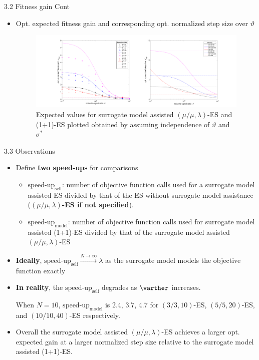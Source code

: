 \documentclass{beamer}
\begin{document}
\begin{frame}{3.2 Fitness gain Cont}
\begin{itemize}
    \item Opt. expected fitness gain and corresponding opt. normalized step size over $\vartheta$


\begin{figure}
\includegraphics[width=1.0\linewidth]{opt_stepSize_fitGain_final.pdf}
    \caption{Expected values for surrogate model assisted $(\mu/\mu,\lambda)$-ES and (1+1)-ES plotted obtained by assuming independence of $\vartheta$ and $\sigma^*$}
\end{figure}
\end{itemize} 
\end{frame}

\begin{frame}{3.3 Observations}
\begin{itemize}
    \item Define \textbf{two speed-ups} for comparisons 
    \begin{itemize}
        \item $\text{speed-up}_{\text{self}}$: number of objective function calls used for a surrogate model assisted ES divided by that of the ES without surrogate model assistance (\textbf{$(\mu/\mu,\lambda)$-ES if not specified}). 
        \item $\text{speed-up}_{\text{model}}$: number of objective function calls used for surrogate model assisted (1+1)-ES divided by that of the surrogate model assisted $(\mu/\mu,\lambda)$-ES
    \end{itemize}     
    \item \textbf{Ideally}, $\text{speed-up}_{\text{self}} \overset{N\rightarrow\infty}{\rightarrow} \lambda$ as the surrogate model models the objective function exactly
    \item \textbf{In reality}, the  $\text{speed-up}_{\text{self}}$ degrades as $\varther$ increases. 
    
    When $N=10$, $\text{speed-up}_{\text{model}}$ is 2.4, 3.7, 4.7 for $(3/3,10)$-ES, $(5/5,20)$-ES, and $(10/10,40)$-ES respectively. 
    \item Overall the surrogate model assisted $(\mu/\mu,\lambda)$-ES achieves a larger opt. expected gain at a larger normalized step size relative to the surrogate model assisted (1+1)-ES. 
\end{itemize}
\end{frame}
\end{document}
